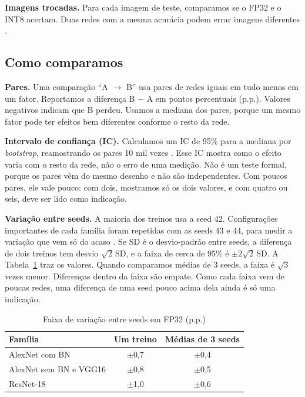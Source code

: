 \documentclass[conference]{IEEEtran}
\begin{document}
\textbf{Imagens trocadas.} Para cada imagem de teste, comparamos se o FP32 e o INT8 acertam. Duas redes com a mesma acurácia podem errar imagens diferentes \cite{hooker2019what}.

\subsection{Como comparamos}
\label{sec:analise}

\textbf{Pares.} Uma comparação ``A $\rightarrow$ B'' usa pares de redes iguais em tudo menos em um fator. Reportamos a diferença B $-$ A em pontos percentuais (p.p.). Valores negativos indicam que B perdeu.
Usamos a mediana dos pares, porque um mesmo fator pode ter efeitos bem diferentes conforme o resto da rede.

\textbf{Intervalo de confiança (IC).} Calculamos um IC de 95\% para a mediana por \textit{bootstrap}, reamostrando os pares 10 mil vezes \cite{efron1993introduction}. Esse IC mostra como o efeito varia com o resto da
rede, não o erro de uma medição. Não é um teste formal, porque os pares vêm do mesmo desenho e não são independentes. Com poucos pares, ele vale pouco: com dois, mostramos só os dois valores, e com quatro ou seis, deve
ser lido como indicação.

\textbf{Variação entre seeds.} A maioria dos treinos usa a seed 42. Configurações importantes de cada família foram repetidas com as seeds 43 e 44, para medir a variação que vem só do acaso \cite{bouthillier2021accounting}.
Se SD é o desvio-padrão entre seeds, a diferença de dois treinos tem desvio $\sqrt{2}\,$SD, e a faixa de cerca de 95\% é $\pm 2\sqrt{2}\,$SD. A Tabela~\ref{tab:ruido} traz os valores. Quando comparamos médias de 3 seeds, a faixa é
$\sqrt{3}$ vezes menor. Diferenças dentro da faixa são empate. Como cada faixa vem de poucas redes, uma diferença de uma seed pouco acima dela ainda é só uma indicação.

\begin{table}[!t]
\caption{Faixa de variação entre seeds em FP32 (p.p.)}
\label{tab:ruido}
\centering
\footnotesize
\begin{tabular}{@{}lcc@{}}
\toprule
\textbf{Família} & \textbf{Um treino} & \textbf{Médias de 3 seeds} \\
\midrule
AlexNet com BN & $\pm$0,7 & $\pm$0,4 \\
AlexNet sem BN e VGG16 & $\pm$0,8 & $\pm$0,5 \\
ResNet-18 & $\pm$1,0 & $\pm$0,6 \\
\bottomrule
\end{tabular}
\end{table}
\end{document}
